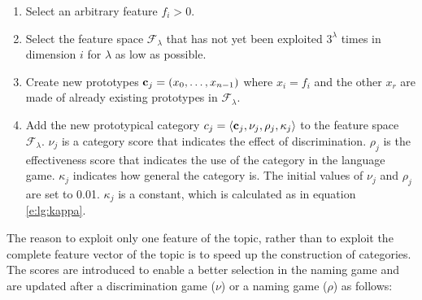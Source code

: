 \begin{enumerate}

\item Select an arbitrary feature $f_i>0$.

\item Select the feature space ${\mathcal F}_\lambda$ that has not yet been exploited $3^\lambda$ times in dimension $i$ for $\lambda$ as low as possible.

\item Create new prototypes ${\bf c}_j = (x_0,\ldots,x_{n-1})$ where $x_i=f_i$ and the other $x_r$ are made of already existing prototypes in ${\mathcal F}_\lambda$.

\item Add the new prototypical category $c_j=\langle {\bf c}_j,\nu_j,\rho_j,\kappa_j \rangle$ to the feature space ${\mathcal F}_\lambda$. $\nu_j$ is a category score that indicates the effect of discrimination. $\rho_j$ is the effectiveness score that indicates the use of the category in the language game. $\kappa_j$ indicates how general the category is. The initial values of $\nu_j$ and $\rho_j$ are set to 0.01. $\kappa_j$ is a constant, which is calculated as in equation \ref{e:lg:kappa}. 

\end{enumerate}


The reason to exploit only one feature of the topic, rather than to exploit the complete feature vector of the topic is to speed up the construction of categories. The scores are introduced to enable a better selection in the naming game and are updated after a discrimination game ($\nu$) or a naming game ($\rho$) as follows:

